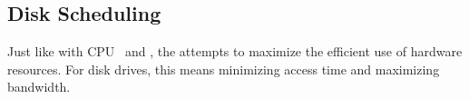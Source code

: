 \subsection{Disk Scheduling}\label{subsec:Disk_Scheduling}
Just like with CPU~ and , the  attempts to maximize the efficient use of hardware resources.
For disk drives, this means minimizing access time and maximizing bandwidth.


